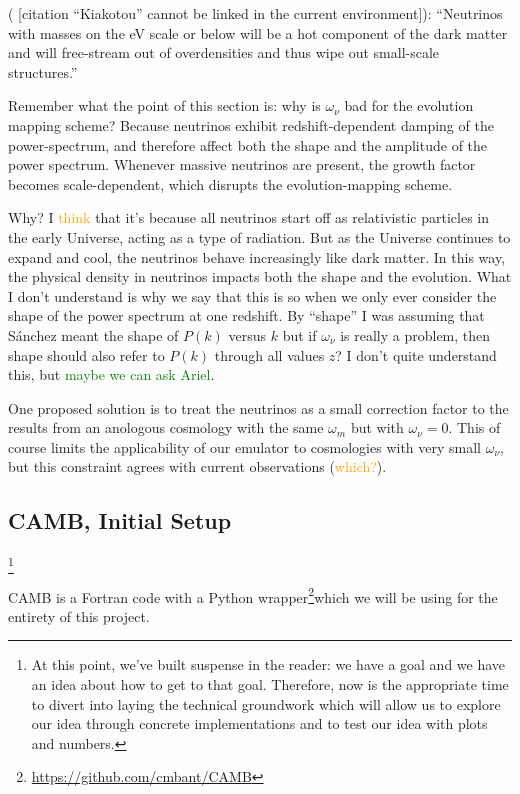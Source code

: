 \documentclass[11pt]{article}
\newcommand{\cbib}[1]
{\IfFileExists{biblatex.sty}
{\cite{#1}}
{[citation ``#1'' cannot be linked in the current environment]}}
\begin{document}
(\cbib{Kiakotou}): ``Neutrinos with masses on the eV scale or below will be a
hot component of the dark matter and will free-stream out of overdensities and
thus wipe out small-scale structures.''

Remember what the point of this section is: why is $\omega_\nu$ bad for the
evolution mapping scheme? Because neutrinos exhibit redshift-dependent
damping of the power-spectrum, and therefore affect both the shape and the
amplitude of the power spectrum. Whenever massive neutrinos are present,
the growth factor becomes scale-dependent, which disrupts the
evolution-mapping scheme.

Why? I \textcolor{orange}{think} that it's because all neutrinos start off as
relativistic particles in the early Universe, acting as a type of radiation.
But as the Universe continues to expand and cool, the neutrinos behave
increasingly like dark matter.
In this way, the physical density in neutrinos impacts both the shape and the
evolution. What I don't understand is why we say that this is so when we
only ever consider the shape of the power spectrum at one redshift. By
``shape'' I was assuming that S\'{a}nchez meant the shape of $P(k)$ versus
$k$ but if $\omega_\nu$ is really a problem, then shape should also refer
to $P(k)$ through all values $z$? I don't quite understand this, but
\textcolor{green}{maybe we can ask Ariel}.

One proposed solution is to treat the neutrinos as a small correction factor
to the results from an anologous cosmology with the same $\omega_m$ but with
$\omega_\nu = 0$. This of course limits the applicability of our emulator to
cosmologies with very small $\omega_\nu$, but this constraint agrees with
current observations (\textcolor{orange}{which?}).

\begin{centering}
\section{CAMB, Initial Setup}
\end{centering}
\footnote{
    At this point, we've built suspense in the reader: we have a goal and
    we have an idea about how to get to that goal. Therefore, now is the
    appropriate time to divert into laying the technical groundwork which
    will allow us to explore our idea through concrete implementations and
    to test our idea with plots and numbers.
}

CAMB is a Fortran code with a Python wrapper\footnote{
\url{https://github.com/cmbant/CAMB}
}which we will be using for the
entirety of this project.
\end{document}
